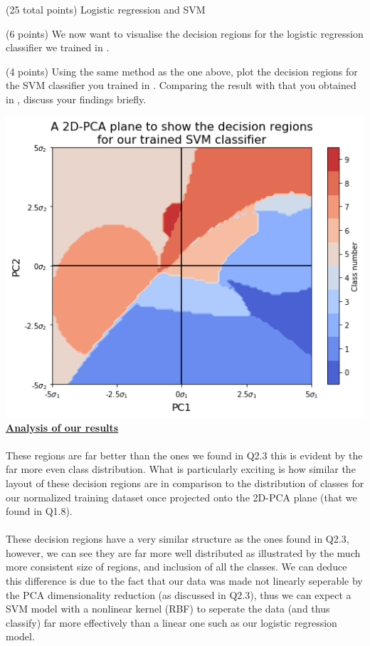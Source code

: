 \documentclass[12pt]{article}
\begin{document}
\begin{question}{(25 total points) Logistic regression and SVM}
\begin{subquestion}{(6 points)
       We now want to visualise the decision regions for the logistic
       regression classifier we trained in .
     }
   \end{subquestion}
   \begin{subquestion}{(4 points)
       Using the same method as the one above, plot the decision regions for
       the SVM classifier you trained in .
       Comparing the result with that you obtained in , discuss your
       findings briefly.
     } \label{Q2.4}
   

      \begin{answerbox}{43em}
         \includegraphics[width=1\textwidth]{images/q24.png}
        \textbf{\footnotesize{\underline{Analysis of our results}}}\\
\\
        \scriptsize{
        These regions are far better than the ones we found in Q2.3 this is evident by the far more even class distribution. What is particularly exciting is how similar the layout of these decision regions are in comparison to the distribution of classes for our normalized training dataset once projected onto the 2D-PCA plane (that we found in Q1.8).\\
\\
        These decision regions have a very similar structure as the ones found in Q2.3, however, we can see they are far more well distributed as illustrated by the much more consistent size of regions, and inclusion of all the classes. We can deduce this difference is due to the fact that our data was made not linearly seperable by the PCA dimensionality reduction (as discussed in Q2.3), thus we can expect a SVM model with a nonlinear kernel (RBF) to seperate the data (and thus classify) far more effectively than a linear one such as our logistic regression model.
        }
      \end{answerbox}
  



\end{subquestion}
\end{question}
\end{document}
